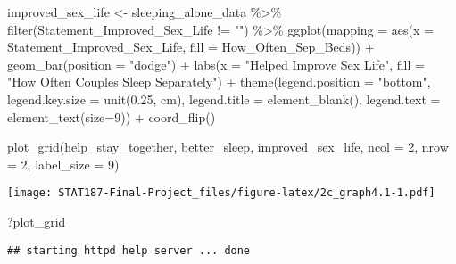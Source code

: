 \documentclass[
]{article}
\newenvironment{Shaded}{\begin{snugshade}}{\end{snugshade}}
\newcommand{\AttributeTok}[1]{\textcolor[rgb]{0.77,0.63,0.00}{#1}}
\newcommand{\DecValTok}[1]{\textcolor[rgb]{0.00,0.00,0.81}{#1}}
\newcommand{\FloatTok}[1]{\textcolor[rgb]{0.00,0.00,0.81}{#1}}
\newcommand{\FunctionTok}[1]{\textcolor[rgb]{0.00,0.00,0.00}{#1}}
\newcommand{\NormalTok}[1]{#1}
\newcommand{\OtherTok}[1]{\textcolor[rgb]{0.56,0.35,0.01}{#1}}
\newcommand{\SpecialCharTok}[1]{\textcolor[rgb]{0.00,0.00,0.00}{#1}}
\newcommand{\StringTok}[1]{\textcolor[rgb]{0.31,0.60,0.02}{#1}}
\begin{document}
\begin{Shaded}
\begin{Highlighting}[]
\NormalTok{improved\_sex\_life }\OtherTok{\textless{}{-}}\NormalTok{ sleeping\_alone\_data }\SpecialCharTok{\%\textgreater{}\%} \FunctionTok{filter}\NormalTok{(Statement\_Improved\_Sex\_Life }\SpecialCharTok{!=} \StringTok{""}\NormalTok{) }\SpecialCharTok{\%\textgreater{}\%}
                      \FunctionTok{ggplot}\NormalTok{(}\AttributeTok{mapping =} \FunctionTok{aes}\NormalTok{(}\AttributeTok{x =}\NormalTok{ Statement\_Improved\_Sex\_Life,}
                                           \AttributeTok{fill =}\NormalTok{ How\_Often\_Sep\_Beds)) }\SpecialCharTok{+}
                     \FunctionTok{geom\_bar}\NormalTok{(}\AttributeTok{position =} \StringTok{"dodge"}\NormalTok{) }\SpecialCharTok{+} 
                     \FunctionTok{labs}\NormalTok{(}\AttributeTok{x =} \StringTok{"Helped Improve Sex Life"}\NormalTok{,}
                          \AttributeTok{fill =} \StringTok{"How Often Couples Sleep Separately"}\NormalTok{) }\SpecialCharTok{+}
                     \FunctionTok{theme}\NormalTok{(}\AttributeTok{legend.position =} \StringTok{"bottom"}\NormalTok{,}
                           \AttributeTok{legend.key.size =} \FunctionTok{unit}\NormalTok{(}\FloatTok{0.25}\NormalTok{, }\StringTok{\textquotesingle{}cm\textquotesingle{}}\NormalTok{), }
                           \AttributeTok{legend.title =} \FunctionTok{element\_blank}\NormalTok{(), }
                           \AttributeTok{legend.text =} \FunctionTok{element\_text}\NormalTok{(}\AttributeTok{size=}\DecValTok{9}\NormalTok{)) }\SpecialCharTok{+}
                     \FunctionTok{coord\_flip}\NormalTok{()}



\FunctionTok{plot\_grid}\NormalTok{(help\_stay\_together, better\_sleep, improved\_sex\_life, }\AttributeTok{ncol =} \DecValTok{2}\NormalTok{, }\AttributeTok{nrow =} \DecValTok{2}\NormalTok{, }\AttributeTok{label\_size =} \DecValTok{9}\NormalTok{) }
\end{Highlighting}
\end{Shaded}

\texttt{[image: STAT187-Final-Project\_files/figure-latex/2c\_graph4.1-1.pdf]}

\begin{Shaded}
\begin{Highlighting}[]
\NormalTok{?plot\_grid}
\end{Highlighting}
\end{Shaded}

\begin{verbatim}
## starting httpd help server ... done
\end{verbatim}
\end{document}
